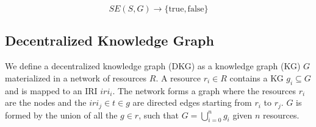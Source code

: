 \begin{equation}
    SE(S, G) \rightarrow \{\mathrm{true}, \mathrm{false}\}
\end{equation}


\subsection{Decentralized Knowledge Graph}
We define a decentralized knowledge graph (DKG) as a knowledge graph (KG) $G$ materialized in a network of resources $R$.
A resource $r_i \in R$ contains a KG $g_i \subseteq G$ and is mapped to an IRI $iri_i$.
The network forms a graph where the resources $r_i$ are the nodes and the $iri_j \in t \in g$ are directed edges starting from $r_i$ to $r_j$.
$G$ is formed by the union of all the $g \in r$, such that $G = \bigcup_{i=0}^{n}g_i$ given $n$ resources.